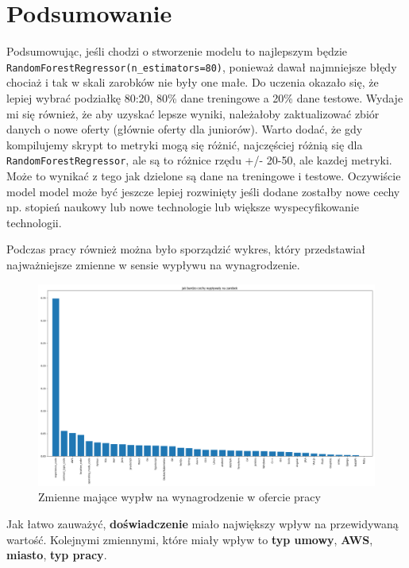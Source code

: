 \documentclass[a4paper]{article}
\begin{document}
\section{Podsumowanie}
\quad Podsumowując, jeśli chodzi o stworzenie modelu to najlepszym będzie \newline \texttt{RandomForestRegressor(n\_estimators=80)},
ponieważ dawał najmniejsze błędy chociaż i tak w skali zarobków nie były one małe.
Do uczenia okazało się, że lepiej wybrać podziałkę 80:20, 80\% dane treningowe a 20\% dane testowe. Wydaje mi się również, że aby uzyskać lepsze wyniki,
należałoby zaktualizować zbiór danych o nowe oferty (głównie oferty dla juniorów). Warto dodać, że
gdy kompilujemy skrypt to metryki mogą się różnić, najczęściej różnią się dla \texttt{RandomForestRegressor}, ale są to różnice rzędu +/- 20-50, ale kazdej metryki. Może to wynikać z tego jak dzielone są dane na treningowe i testowe.
Oczywiście model model może być jeszcze lepiej rozwinięty jeśli dodane zostałby nowe cechy np. stopień naukowy lub nowe technologie lub większe wyspecyfikowanie technologii.

\quad Podczas pracy również można było sporządzić wykres, który przedstawiał najważniejsze zmienne w sensie wypływu na wynagrodzenie.

\begin{figure}[H]
    \centering
    \includegraphics[width=\textwidth]{../analysis/plots/wyniki/importance_of_vars.png}
    \caption{Zmienne mające wypłw na wynagrodzenie w ofercie pracy}
\end{figure}

\quad Jak łatwo zauważyć, \textbf{doświadczenie} miało największy wpływ na przewidywaną wartość.
Kolejnymi zmiennymi, które miały wpływ to \textbf{typ umowy}, \textbf{AWS}, \textbf{miasto}, \textbf{typ pracy}.
\end{document}
